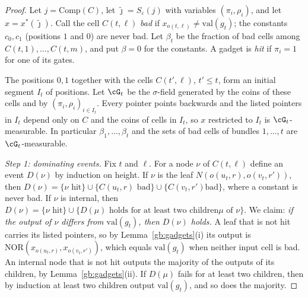 \documentclass[11pt]{amsart}
\theoremstyle{definition}
\theoremstyle{remark}
\newcommand{\eps}{\varepsilon}
\newcommand{\jt}{\tilde{\jmath}}
\newcommand{\NOR}{\mathrm{NOR}}
\newcommand{\val}{\mathrm{val}}
\newcommand{\Comp}{\mathrm{Comp}}
\begin{document}
\begin{proof}
Let $j=\Comp(C)$, let $\jt=S_\eps(j)$ with variables $(\pi_i,\rho_i)$, and
let $x=x^*(\jt)$. Call the cell $C(t,\ell)$ \emph{bad} if
$x_{o(t,\ell)}\ne\val(g_t)$; the constants $c_0,c_1$ (positions $1$ and $0$)
are never bad. Let $\beta_t$ be the fraction of bad cells among
$C(t,1),\dots,C(t,m)$, and put $\beta=0$ for the constants. A gadget is
\emph{hit} if $\pi_i=1$ for one of its gates.

The positions $0,1$ together with the cells $C(t',\ell)$, $t'\le t$, form an
initial segment $I_t$ of positions. Let $\cG_t$ be the $\sigma$-field
generated by the coins of these cells and by $(\pi_i,\rho_i)_{i\in I_t}$.
Every pointer points backwards and the listed pointers in $I_t$ depend only
on $C$ and the coins of cells in $I_t$, so $x$ restricted to $I_t$ is
$\cG_t$-measurable. In particular $\beta_1,\dots,\beta_t$ and the sets of
bad cells of bundles $1,\dots,t$ are $\cG_t$-measurable.

\emph{Step 1: dominating events.} Fix $t$ and $\ell$. For a node $\nu$ of
$C(t,\ell)$ define an event $D(\nu)$ by induction on height. If $\nu$ is
the leaf $N(o(u_t,r),o(v_t,r'))$, then
$D(\nu)=\{\nu\text{ hit}\}\cup\{C(u_t,r)\text{ bad}\}\cup\{C(v_t,r')\text{
bad}\}$, where a constant is never bad. If $\nu$ is internal, then
$D(\nu)=\{\nu\text{ hit}\}\cup\{D(\mu)\text{ holds for at least two children
}\mu\text{ of }\nu\}$. We claim: \emph{if the output of $\nu$ differs from
$\val(g_t)$, then $D(\nu)$ holds.} A leaf that is not hit carries its listed
pointers, so by Lemma~\ref{gb:gadgets}(i) its output is
$\NOR(x_{o(u_t,r)},x_{o(v_t,r')})$, which equals $\val(g_t)$ when neither
input cell is bad. An internal node that is not hit outputs the majority of
the outputs of its children, by Lemma~\ref{gb:gadgets}(ii). If $D(\mu)$
fails for at least two children, then by induction at least two children
output $\val(g_t)$, and so does the majority.


\end{proof}
\end{document}
